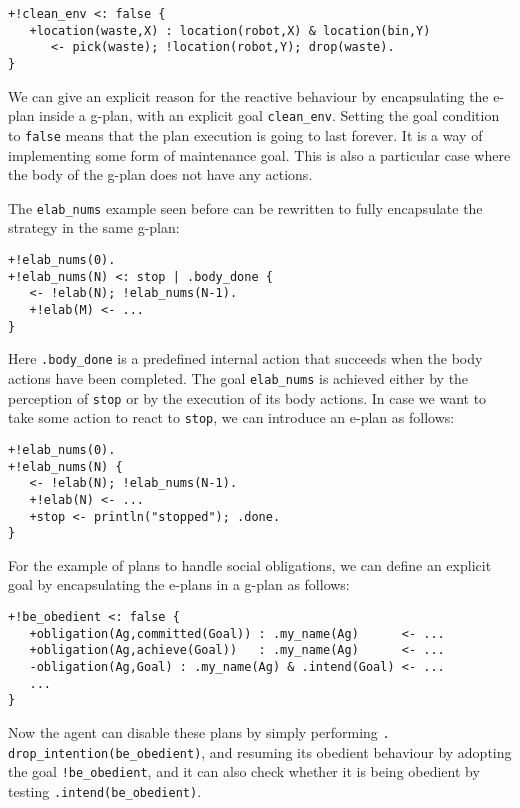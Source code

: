 \begin{small}
\begin{verbatim}
+!clean_env <: false {
   +location(waste,X) : location(robot,X) & location(bin,Y)
      <- pick(waste); !location(robot,Y); drop(waste).
}
\end{verbatim}
\end{small}

\noindent We can give an explicit reason for the reactive behaviour by
encapsulating the e-plan inside a g-plan, with an explicit goal
\texttt{clean\_env}.
%
Setting the goal condition to \texttt{false} means that the plan
execution is going to last forever. It is a way of implementing some
form of maintenance goal.
%
This is also a particular case where the body of the g-plan does not
have any actions.
%

The \texttt{elab\_nums} example seen before can be rewritten to fully
encapsulate the strategy in the same g-plan:

{\small
\begin{verbatim}
+!elab_nums(0).
+!elab_nums(N) <: stop | .body_done {
   <- !elab(N); !elab_nums(N-1).	
   +!elab(M) <- ...
}
\end{verbatim}}

  \noindent Here \texttt{.body\_done} is a predefined internal action
  that succeeds when the body actions have been completed. The goal
  \texttt{elab\_nums} is achieved either by the perception of
  \texttt{stop} or by the execution of its body actions.
%
  In case we want to take some action to react to \texttt{stop}, we
  can introduce an e-plan as follows:

{\small
\begin{verbatim}
+!elab_nums(0).
+!elab_nums(N) {
   <- !elab(N); !elab_nums(N-1).
   +!elab(N) <- ...
   +stop <- println("stopped"); .done.
}
\end{verbatim}}

  For the example of plans to handle social obligations, we can define
  an explicit goal by encapsulating the e-plans in a g-plan as
  follows:
\begin{small}
\begin{verbatim}
+!be_obedient <: false {
   +obligation(Ag,committed(Goal)) : .my_name(Ag)      <- ...
   +obligation(Ag,achieve(Goal))   : .my_name(Ag)      <- ...
   -obligation(Ag,Goal) : .my_name(Ag) & .intend(Goal) <- ...
   ...
}
\end{verbatim}
\end{small}
\noindent Now the agent can disable these plans by simply performing
\texttt{. drop\_intention(be\_obedient)}, and resuming its obedient
behaviour by adopting the goal \texttt{!be\_obedient}, and it can also
check whether it is being obedient by testing
\texttt{.intend(be\_obedient)}.

